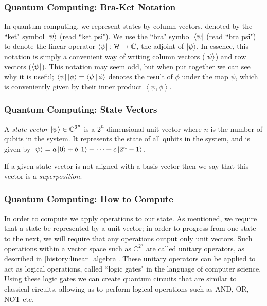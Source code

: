 \documentclass{beamer}
\renewcommand{\bra}{\Bra}
\renewcommand{\ket}{\Ket}
\renewcommand{\braket}{\Braket}
\renewcommand{\bra}{\Bra}
\renewcommand{\ket}{\Ket}
\renewcommand{\braket}{\Braket}
\newcommand{\inner}[2]{\left\langle #1, #2 \right\rangle}
\newcommand{\bb}[1]{\mathbb{#1}}
\renewcommand{\cal}[1]{\mathcal{#1}}
\begin{document}
\begin{frame}
\frametitle{Quantum Computing: Bra-Ket Notation}
        In quantum computing, we represent states by column vectors, denoted by the ``ket" symbol $\ket{\psi}$ (read ``ket psi").
        We use the ``bra" symbol $\bra{\psi}$ (read ``bra psi") to denote the linear operator $\bra{\psi} : \cal{H} \to \bb{C}$, the adjoint of $\ket{\psi}$.
        In essence, this notation is simply a convenient way of writing column vectors ($\ket{\psi}$) and row vectors ($\bra{\psi}$). This notation may seem odd, but when put together we can see why it is useful; $\bra{\psi} \ket{\phi} = \braket{\psi | \phi}$ denotes the result of $\phi$ under the map $\psi$, which is conveniently given by their inner product $\inner{\psi}{\phi}$.
\end{frame}

\begin{frame}
\frametitle{Quantum Computing: State Vectors}
        \begin{definition}\label{def:state_vector}
            A \textit{state vector} $\ket{\psi} \in \bb{C}^{2^n}$ is a $2^n$-dimensional unit vector where $n$ is the number of qubits in the system.
            It represents the state of all qubits in the system, and is given by $\ket{\psi} = a \ket{0} + b \ket{1} + \dots + c \ket{2^n - 1}$.
        \end{definition}
        \begin{definition}[Superposition]\label{def:superposition}
            If a given state vector is not aligned with a basis vector then we say that this vector is a \textit{superposition}.
        \end{definition}
\end{frame}

\begin{frame}
\frametitle{Quantum Computing: How to Compute}
        In order to compute we apply operations to our state. As mentioned, we require that a state be represented by a unit vector; in order to progress from one state to the next, we will require that any operations output only unit vectors. 
        Such operations within a vector space such as $\bb{C}^{2^n}$ are called unitary operators, as described in \ref{history:linear_algebra}.
        These unitary operators can be applied to act as logical operations, called ``logic gates" in the language of computer science. 
        Using these logic gates we can create quantum circuits that are similar to classical circuits, allowing us to perform logical operations such as AND, OR, NOT etc.
\end{frame}
\end{document}
